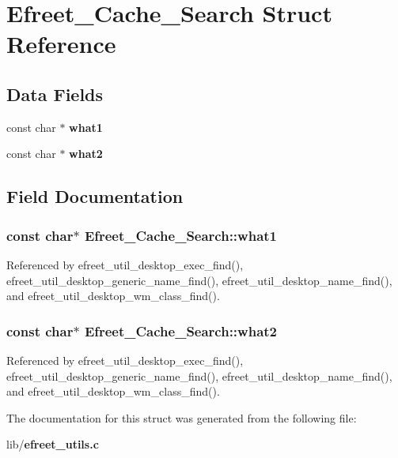 \section{Efreet\_\-Cache\_\-Search Struct Reference}
\label{structEfreet__Cache__Search}
\subsection*{Data Fields}
\begin{CompactItemize}
\item 
const char $\ast$ {\bf what1}
\item 
const char $\ast$ {\bf what2}
\end{CompactItemize}


\subsection{Field Documentation}
\subsubsection{\setlength{\rightskip}{0pt plus 5cm}const char$\ast$ {\bf Efreet\_\-Cache\_\-Search::what1}}\label{structEfreet__Cache__Search_276a9eca3a8ab4983b00713c327f3f52}




Referenced by efreet\_\-util\_\-desktop\_\-exec\_\-find(), efreet\_\-util\_\-desktop\_\-generic\_\-name\_\-find(), efreet\_\-util\_\-desktop\_\-name\_\-find(), and efreet\_\-util\_\-desktop\_\-wm\_\-class\_\-find().
\subsubsection{\setlength{\rightskip}{0pt plus 5cm}const char$\ast$ {\bf Efreet\_\-Cache\_\-Search::what2}}\label{structEfreet__Cache__Search_35dac3d7f03315287bc9429c07258a92}




Referenced by efreet\_\-util\_\-desktop\_\-exec\_\-find(), efreet\_\-util\_\-desktop\_\-generic\_\-name\_\-find(), efreet\_\-util\_\-desktop\_\-name\_\-find(), and efreet\_\-util\_\-desktop\_\-wm\_\-class\_\-find().

The documentation for this struct was generated from the following file:\begin{CompactItemize}
\item 
lib/{\bf efreet\_\-utils.c}\end{CompactItemize}
